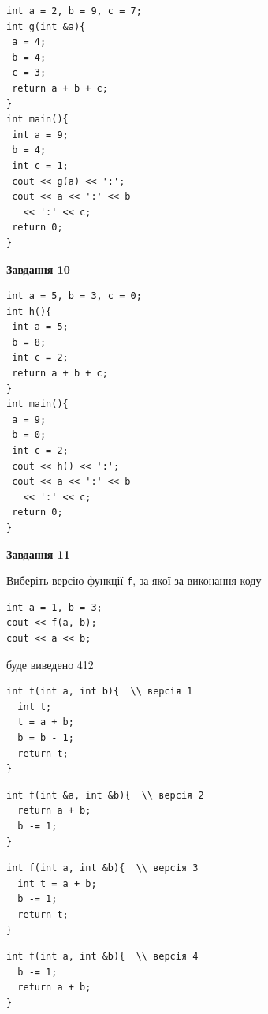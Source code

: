 \documentclass[12pt, ukrainian]{article}
\def\code#1{\Verb!#1!}
\begin{document}
{\begin {large}
\begin{minipage}[t]{7.0cm}
\begin{verbatim}
int a = 2, b = 9, c = 7;
int g(int &a){
 a = 4;
 b = 4;
 c = 3;
 return a + b + c;
}
int main(){
 int a = 9;
 b = 4;
 int c = 1;
 cout << g(a) << ':';
 cout << a << ':' << b 
   << ':' << c;
 return 0;
}
\end{verbatim}



\begin{center}
\textbf{Завдання 10}
\end{center}
\vspace{-8mm}

\begin{verbatim}
int a = 5, b = 3, c = 0;
int h(){
 int a = 5;
 b = 8;
 int c = 2;
 return a + b + c;
}
int main(){
 a = 9;
 b = 0;
 int c = 2;
 cout << h() << ':';
 cout << a << ':' << b 
   << ':' << c;
 return 0;
}
\end{verbatim}

\end{minipage}
\vline \hspace{1mm}
\begin{minipage}[t]{11.0cm}

\begin{center}
\textbf{Завдання 11}
\end{center}
Виберіть версію функції \code{f}, за якої за виконання коду
\begin{verbatim}
int a = 1, b = 3;
cout << f(a, b);
cout << a << b;
\end{verbatim}

буде виведено 412

\begin{verbatim}
int f(int a, int b){  \\ версія 1
  int t;
  t = a + b;
  b = b - 1;
  return t;
}
\end{verbatim}

\vspace{-8mm}\begin{verbatim}
int f(int &a, int &b){  \\ версія 2
  return a + b;
  b -= 1;
}
\end{verbatim}

\vspace{-8mm}\begin{verbatim}
int f(int a, int &b){  \\ версія 3
  int t = a + b;
  b -= 1;
  return t;
}
\end{verbatim}

\vspace{-8mm}\begin{verbatim}
int f(int a, int &b){  \\ версія 4
  b -= 1;
  return a + b;
}
\end{verbatim}




\end{minipage}
\end{large}}
\end{document}
